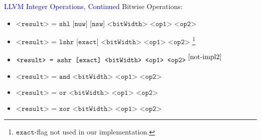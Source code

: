 \begin{frame}[fragile]{\textcolor{blue}{LLVM Integer Operations, Continued}}
Bitwise Operations:
\begin{itemize}
\item $\texttt{<result> = shl [nuw] [nsw] <bitWidth> <op1> <op2>}$
\item $\texttt{<result> = lshr [exact] <bitWidth> <op1> <op2>}$ \footnote{\label{not-impl2} $\texttt{exact}$-flag not used in our implementation.}
\item $\texttt{<result> = ashr [exact] <bitWidth> <op1> <op2>}^{~\ref{not-impl2}}$
\item $\texttt{<result> = and <bitWidth> <op1> <op2>}$
\item $\texttt{<result> = or <bitWidth> <op1> <op2>}$
\item $\texttt{<result> = xor <bitWidth> <op1> <op2>}$
\end{itemize}

\end{frame}



\begin{frame}

\end{frame}

